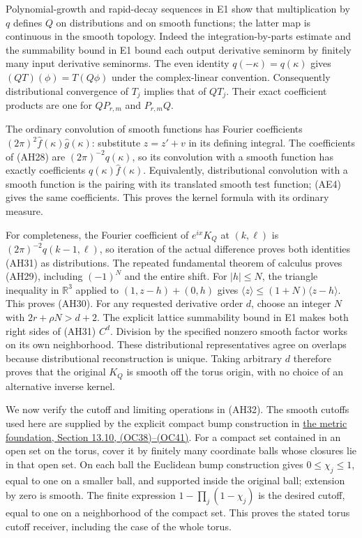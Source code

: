 \documentclass[
  11pt,
]{article}
\begin{document}
Polynomial-growth and rapid-decay sequences in E1 show that
multiplication by \(q\) defines \(Q\) on distributions and on smooth
functions; the latter map is continuous in the smooth topology. Indeed
the integration-by-parts estimate and the summability bound in E1 bound
each output derivative seminorm by finitely many input derivative
seminorms. The even identity \(q(-\kappa)=q(\kappa)\) gives
\((QT)(\phi)=T(Q\phi)\) under the complex-linear convention.
Consequently distributional convergence of \(T_j\) implies that of
\(QT_j\). Their exact coefficient products are one for \(QP_{r,m}\) and
\(P_{r,m}Q\).

The ordinary convolution of smooth functions has Fourier coefficients
\((2\pi)^2\widehat f(\kappa)\widehat g(\kappa)\): substitute \(z=z'+v\)
in its defining integral. The coefficients of (AH28) are
\((2\pi)^{-2}q(\kappa)\), so its convolution with a smooth function has
exactly coefficients \(q(\kappa)\widehat f(\kappa)\). Equivalently,
distributional convolution with a smooth function is the pairing with
its translated smooth test function; (AE4) gives the same coefficients.
This proves the kernel formula with its ordinary measure.

For completeness, the Fourier coefficient of \(e^{ix}K_Q\) at
\((k,\ell)\) is \((2\pi)^{-2}q(k-1,\ell)\), so iteration of the actual
difference proves both identities (AH31) as distributions. The repeated
fundamental theorem of calculus proves (AH29), including \((-1)^N\) and
the entire shift. For \(|h|\leq N\), the triangle inequality in
\(\mathbb R^3\) applied to \((1,z-h)+(0,h)\) gives
\(\langle z\rangle\leq(1+N)\langle z-h\rangle\). This proves (AH30). For
any requested derivative order \(d\), choose an integer \(N\) with
\(2r+\rho N>d+2\). The explicit lattice summability bound in E1 makes
both right sides of (AH31) \(C^d\). Division by the specified nonzero
smooth factor works on its own neighborhood. These distributional
representatives agree on overlaps because distributional reconstruction
is unique. Taking arbitrary \(d\) therefore proves that the original
\(K_Q\) is smooth off the torus origin, with no choice of an alternative
inverse kernel.

We now verify the cutoff and limiting operations in (AH32). The smooth
cutoffs used here are supplied by the explicit compact bump construction
in
\href{metric-foundation-bridges.pdf\#section*.128}{the
metric foundation, Section 13.10, (OC38)--(OC41)}. For a compact set
contained in an open set on the torus, cover it by finitely many
coordinate balls whose closures lie in that open set. On each ball the
Euclidean bump construction gives \(0\leq\chi_j\leq1\), equal to one on
a smaller ball, and supported inside the original ball; extension by
zero is smooth. The finite expression \(1-\prod_j(1-\chi_j)\) is the
desired cutoff, equal to one on a neighborhood of the compact set. This
proves the stated torus cutoff receiver, including the case of the whole
torus.
\end{document}
